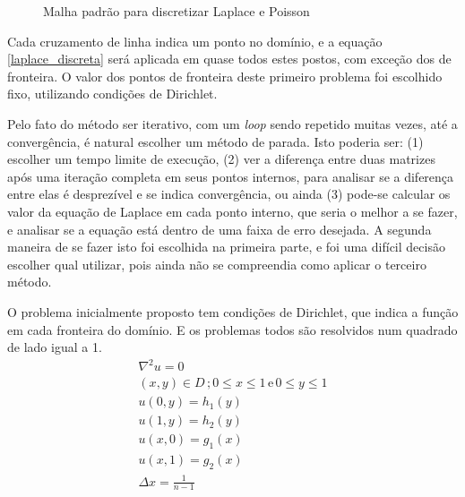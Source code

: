 \documentclass[journal]{IEEEtran}
\begin{document}
\begin{figure}[!ht]
\centering
{}
\caption{Malha padrão para discretizar Laplace e Poisson\label{malha_poisson}}
\end{figure}
Cada cruzamento de linha indica um ponto no domínio, e a equação \ref{laplace_discreta} será aplicada em quase todos estes postos, com exceção dos de fronteira. O valor dos pontos de fronteira deste primeiro problema foi escolhido fixo, utilizando condições de Dirichlet. 

Pelo fato do método ser iterativo, com um \textit{loop} sendo repetido muitas vezes, até a convergência, é natural escolher um método de parada. Isto poderia ser: (1) escolher um tempo limite de execução, (2) ver a diferença entre duas matrizes após uma iteração completa em seus pontos internos, para analisar se a diferença entre elas é desprezível e se indica convergência, ou ainda (3) pode-se calcular os valor da equação de Laplace em cada ponto interno, que seria o melhor a se fazer, e analisar se a equação está dentro de uma faixa de erro desejada. A segunda maneira de se fazer isto foi escolhida na primeira parte, e foi uma difícil decisão escolher qual utilizar, pois ainda não se compreendia como aplicar o terceiro método.

O problema inicialmente proposto tem condições de Dirichlet, que indica a função em cada fronteira do domínio. E os problemas todos são resolvidos num quadrado de lado igual a 1.
\begin{eqnarray}
\nabla^2 u=0 \\
(x,y) \in D\,; 0\le x\le 1\,\textrm{e}\,0\le y\le 1 \nonumber \\
u(0,y)=h_1(y) \nonumber \\
u(1,y)=h_2(y) \nonumber \\
u(x,0)=g_1(x) \nonumber \\
u(x,1)=g_2(x) \nonumber \\
\Delta x = \frac{1}{n-1} \nonumber
\end{eqnarray}
\end{document}
